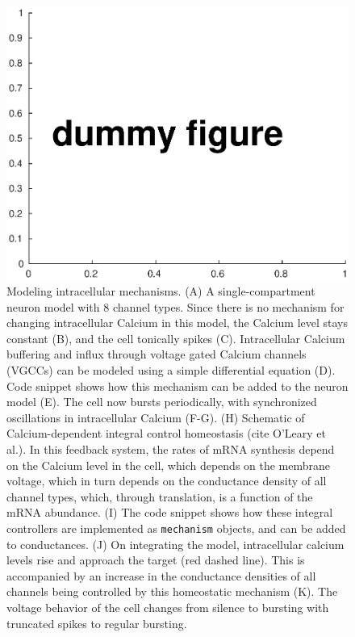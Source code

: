 \documentclass{frontiersSCNS} %
\begin{document}
\begin{figure}[!htb]
	\centering
	\includegraphics[width=1.0\linewidth]{gfx/figure_mechanism}
	\caption{Modeling intracellular mechanisms. (A) A single-compartment neuron model with 8 channel types. Since there is no mechanism for changing intracellular Calcium in this model, the Calcium level stays constant (B), and the cell tonically spikes (C). Intracellular Calcium buffering and influx through voltage gated Calcium channels (VGCCs) can be modeled using a simple differential equation (D). Code snippet shows how this mechanism can be added to the neuron model (E). The cell now bursts periodically, with synchronized oscillations in intracellular Calcium (F-G). (H) Schematic of Calcium-dependent integral control homeostasis (cite O'Leary et al.). In this feedback system, the rates of mRNA synthesis depend on the Calcium level in the cell, which depends on the membrane voltage, which in turn depends on the conductance density of all channel types, which, through translation, is a function of the mRNA abundance. (I) The code snippet shows how these integral controllers are implemented as \texttt{mechanism} objects, and can be added to conductances. (J) On integrating the model, intracellular calcium levels rise and approach the target (red dashed line). This is accompanied by an increase in the conductance densities of all channels being controlled by this homeostatic mechanism (K). The voltage behavior of the cell changes from silence to bursting with truncated spikes to regular bursting.}
	\label{fig:figuremechanism}
\end{figure}
\end{document}
